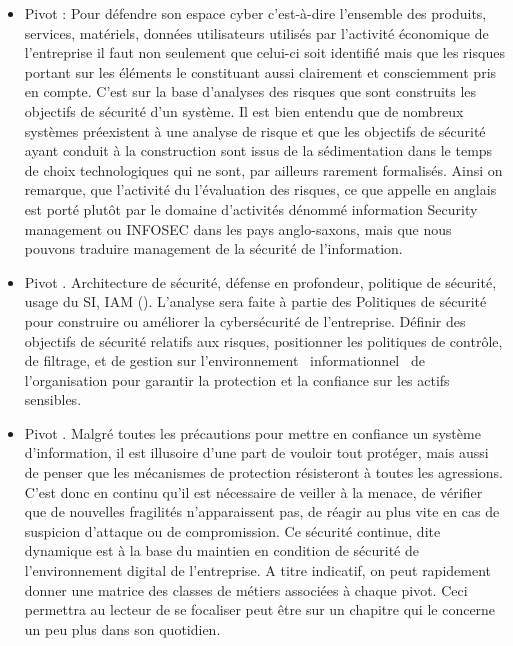 \begin{itemize}
\item Pivot  : Pour défendre son espace cyber  c'est-à-dire l'ensemble des produits, services, matériels, données utilisateurs utilisés par l'activité  économique de l'entreprise il faut non seulement que celui-ci soit identifié mais que les risques portant sur les éléments le constituant     aussi clairement et consciemment pris en compte. C'est sur la base d'analyses des risques que sont construits les objectifs de sécurité d'un système. Il est bien entendu que de nombreux systèmes préexistent à une analyse de risque et que les objectifs de sécurité ayant conduit à la construction sont issus de  la sédimentation dans le temps de choix technologiques qui ne sont, par ailleurs rarement formalisés. Ainsi on remarque, que l'activité du l'évaluation des risques, ce que appelle en anglais  est porté plutôt par le domaine d'activités dénommé  information Security management  ou INFOSEC dans les pays anglo-saxons, mais que nous pouvons traduire  management de la sécurité de l'information.
\item Pivot  . Architecture de sécurité, défense en profondeur, politique de sécurité, usage du SI, IAM (). L'analyse sera faite à partie des Politiques de sécurité pour construire ou améliorer la cybersécurité de l'entreprise. Définir des objectifs de sécurité relatifs aux risques,  positionner les politiques de contrôle, de filtrage, et de gestion sur l'environnement  informationnel  de  l'organisation pour garantir la protection et la confiance sur les actifs sensibles. 
\item  Pivot  . Malgré toutes les précautions pour mettre en confiance un système d'information, il est illusoire d'une part de vouloir tout protéger, mais aussi de penser que les mécanismes de  protection résisteront à toutes les agressions. C'est donc en continu qu'il est nécessaire de veiller à la menace, de vérifier que de nouvelles fragilités n'apparaissent pas, de réagir au plus vite en cas de suspicion d'attaque ou de compromission.  Ce sécurité continue, dite dynamique est à la base du maintien en condition de sécurité de l'environnement digital de l'entreprise. 
A titre indicatif, on peut rapidement donner une matrice des classes de métiers associées à chaque pivot. Ceci permettra au lecteur de se focaliser peut être sur un chapitre qui le concerne un peu plus dans son quotidien.
\end{itemize}

